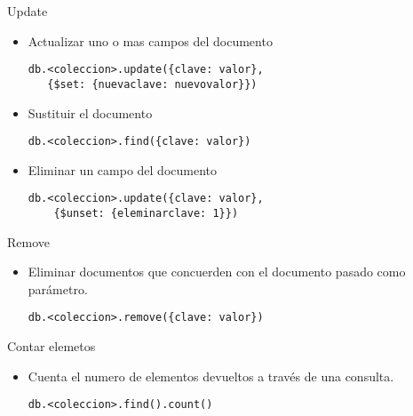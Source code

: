 \documentclass[12pt]{beamer}
\begin{document}
\begin{frame}[fragile]{Update}

  \begin{itemize}

    \item Actualizar uno o mas campos del documento
      \begin{verbatim}
db.<coleccion>.update({clave: valor}, 
   {$set: {nuevaclave: nuevovalor}})
         \end{verbatim}

       \item Sustituir el documento 
        \begin{verbatim}
db.<coleccion>.find({clave: valor})
         \end{verbatim}

         \item Eliminar un campo del documento
           \begin{verbatim}
db.<coleccion>.update({clave: valor}, 
    {$unset: {eleminarclave: 1}})
           \end{verbatim}
    
  \end{itemize}
\end{frame}

\begin{frame}[fragile]{Remove}

  \begin{itemize}
    \item Eliminar documentos que concuerden con el documento pasado como parámetro.

    \begin{verbatim}
db.<coleccion>.remove({clave: valor})
    \end{verbatim}
  \end{itemize}
\end{frame}

\begin{frame}[fragile]{Contar elemetos}

  \begin{itemize}
    \item Cuenta el numero de elementos devueltos a través de una consulta.

    \begin{verbatim}
db.<coleccion>.find().count()
    \end{verbatim}
  \end{itemize}
\end{frame}
\end{document}
